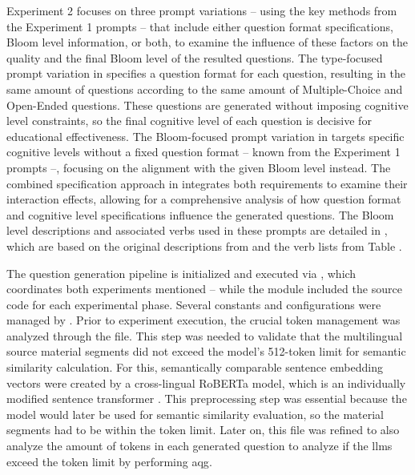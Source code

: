 Experiment 2 focuses on three prompt variations -- using the key methods from the Experiment 1 prompts -- that include either question format specifications, Bloom level information, or both, to examine the influence of these factors on the quality and the final Bloom level of the resulted questions. The type-focused prompt variation in  specifies a question format for each question, resulting in the same amount of questions according to the same amount of Multiple-Choice and Open-Ended questions. These questions are generated without imposing cognitive level constraints, so the final cognitive level of each question is decisive for educational effectiveness. The Bloom-focused prompt variation in  targets specific cognitive levels without a fixed question format -- known from the Experiment 1 prompts --, focusing on the alignment with the given Bloom level instead. The combined specification approach in  integrates both requirements to examine their interaction effects, allowing for a comprehensive analysis of how question format and cognitive level specifications influence the generated questions. The Bloom level descriptions and associated verbs used in these prompts are detailed in , which are based on the original descriptions from \cite{krathwohl_revision_2002} and the verb lists from Table .

The question generation pipeline is initialized and executed via , which coordinates both experiments mentioned -- while the module  included the source code for each experimental phase. Several constants and configurations were managed by . Prior to experiment execution, the crucial token management was analyzed through the  file. This step was needed to validate that the multilingual source material segments did not exceed the model's 512-token limit for semantic similarity calculation. For this, semantically comparable sentence embedding vectors were created by a cross-lingual RoBERTa model, which is an individually modified sentence transformer \cite{reimers_sentence-bert_2019}. This preprocessing step was essential because the model would later be used for semantic similarity evaluation, so the material segments had to be within the token limit. Later on, this file was refined to also analyze the amount of tokens in each generated question to analyze if the \acp{llm} exceed the token limit by performing \ac{aqg}.

